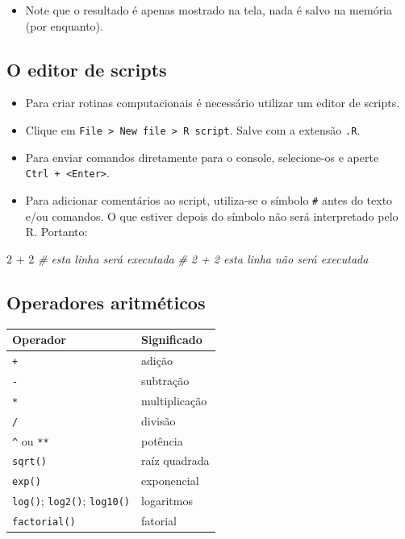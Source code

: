 \documentclass[
  10pt,
  a4paper]{book}
\newenvironment{Shaded}{\begin{snugshade}}{\end{snugshade}}
\newcommand{\CommentTok}[1]{\textcolor[rgb]{0.56,0.35,0.01}{\textit{#1}}}
\newcommand{\DecValTok}[1]{\textcolor[rgb]{0.00,0.00,0.81}{#1}}
\newcommand{\SpecialCharTok}[1]{\textcolor[rgb]{0.00,0.00,0.00}{#1}}
\providecommand{\tightlist}{%
  \setlength{\itemsep}{0pt}\setlength{\parskip}{0pt}}
\begin{document}
\begin{itemize}
\tightlist
\item
  Note que o resultado é apenas mostrado na tela, nada é salvo na
  memória (por enquanto).
\end{itemize}

\hypertarget{o-editor-de-scripts}{%
\subsection{O editor de scripts}\label{o-editor-de-scripts}}

\begin{itemize}
\tightlist
\item
  Para criar rotinas computacionais é necessário utilizar um editor
  de scripts.
\item
  Clique em \texttt{File\ \textgreater{}\ New\ file\ \textgreater{}\ R\ script}. Salve com a extensão
  \texttt{.R}.
\item
  Para enviar comandos diretamente para o console, selecione-os e
  aperte \texttt{Ctrl\ +\ \textless{}Enter\textgreater{}}.
\item
  Para adicionar comentários ao script, utiliza-se o símbolo
  \texttt{\#} antes do texto e/ou comandos. O que estiver depois do
  símbolo não será interpretado pelo R. Portanto:
\end{itemize}

\begin{Shaded}
\begin{Highlighting}[]
\DecValTok{2} \SpecialCharTok{+} \DecValTok{2}     \CommentTok{\# esta linha será executada}
\CommentTok{\# 2 + 2     esta linha não será executada}
\end{Highlighting}
\end{Shaded}

\hypertarget{operadores-aritmuxe9ticos}{%
\subsection{Operadores aritméticos}\label{operadores-aritmuxe9ticos}}

\begin{longtable}[]{@{}ll@{}}
\toprule()
Operador & Significado \\
\midrule()
\endhead
\texttt{+} & adição \\
\texttt{-} & subtração \\
\texttt{*} & multiplicação \\
\texttt{/} & divisão \\
\texttt{\^{}} ou \texttt{**} & potência \\
\texttt{sqrt()} & raíz quadrada \\
\texttt{exp()} & exponencial \\
\texttt{log()}; \texttt{log2()}; \texttt{log10()} & logaritmos \\
\texttt{factorial()} & fatorial \\
\bottomrule()
\end{longtable}
\end{document}
